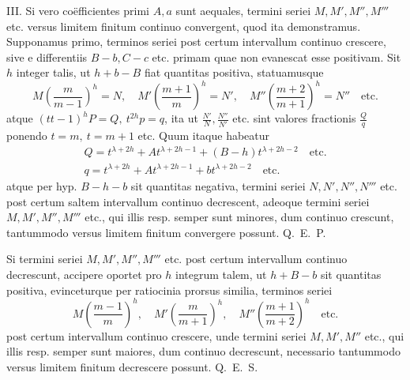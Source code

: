 III. Si vero co\"efficientes primi $A,a$ sunt aequales, termini seriei $M,\allowbreak M',\allowbreak M'',\allowbreak M'''$ etc. versus limitem finitum continuo convergent, quod ita demonstramus. Supponamus primo, terminos seriei post certum intervallum continuo crescere, sive e differentiis $B-b,C-c$ etc. primam quae non evanescat
esse positivam. Sit $h$ integer talis, ut $h+b-B$ fiat quantitas positiva, statuamusque
\[
M\left(\frac{m}{m-1}\right)^h=N,\quad
M'\left(\frac{m+1}{m}\right)^h=N',\quad
M''\left(\frac{m+2}{m+1}\right)^h=N''\quad\mathrm{etc.}
\]
atque $(tt-1)^hP=Q,\ t^{2h}p=q$, ita ut $\frac{N'}{N},\frac{N''}{N'}$ etc. sint valores fractionis $\frac{Q}{q}$ ponendo $t=m,\ t=m+1$ etc. Quum itaque habeatur
\[
\begin{array}{l}
Q=t^{\lambda+2h}+At^{\lambda+2h-1}+(B-h)t^{\lambda+2h-2}\quad\mathrm{etc.}\\
q=t^{\lambda+2h}+At^{\lambda+2h-1}+bt^{\lambda+2h-2}\quad\mathrm{etc.}
\end{array}
\]
atque per hyp. $B-h-b$ sit quantitas negativa, termini seriei $N,N',N'',N'''$ etc. post certum saltem intervallum continuo decrescent, adeoque termini seriei $M,M',M'',M'''$ etc., qui illis resp. semper sunt minores, dum continuo crescunt, tantummodo versus limitem finitum convergere possunt. Q.~E.~P.

Si termini seriei $M,M',M'',M'''$ etc. post certum intervallum continuo decrescunt, accipere oportet pro $h$ integrum talem, ut $h+B-b$ sit quantitas positiva, evinceturque per ratiocinia prorsus similia, terminos seriei
\[
M\left(\frac{m-1}{m}\right)^h,\quad
M'\left(\frac{m}{m+1}\right)^h,\quad
M''\left(\frac{m+1}{m+2}\right)^h\quad\mathrm{etc.}
\]
post certum intervallum continuo crescere, unde termini seriei $M,M',M''$ etc., qui illis resp. semper sunt maiores, dum continuo decrescunt, necessario tantummodo versus limitem finitum decrescere possunt. Q.~E.~S.

